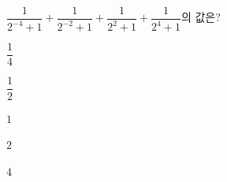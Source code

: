 $\dfrac{1}{2^{-4}+1}+\dfrac{1}{2^{-2}+1}+\dfrac{1}{2^{2}+1}+\dfrac{1}{2^{4}+1}$의 값은?
\begin{choices32}{\rule[-3ex]{0pt}{8ex}$\dfrac{1}{4}$}{\rule[-3ex]{0pt}{8ex}$\dfrac{1}{2}$}{\rule[-3ex]{0pt}{8ex}$1$}{\rule[-3ex]{0pt}{8ex}$2$}{\rule[-3ex]{0pt}{8ex}$4$}\end{choices32}
